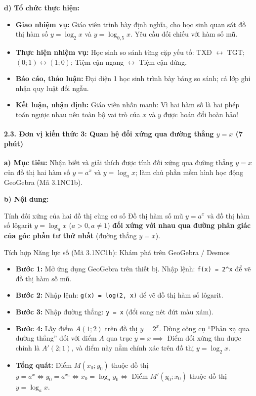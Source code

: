 \documentclass[12pt, a4paper]{article}
\begin{document}
\noindent \textbf{d) Tổ chức thực hiện:}
\begin{itemize}[leftmargin=0.6cm]
    \item \textbf{Giao nhiệm vụ:} Giáo viên trình bày định nghĩa, cho học sinh quan sát đồ thị hàm số $y = \log_2 x$ và $y = \log_{0{,}5} x$. Yêu cầu đối chiếu với hàm số mũ.
    \item \textbf{Thực hiện nhiệm vụ:} Học sinh so sánh từng cặp yếu tố: TXĐ $\leftrightarrow$ TGT; $(0; 1) \leftrightarrow (1; 0)$; Tiệm cận ngang $\leftrightarrow$ Tiệm cận đứng.
    \item \textbf{Báo cáo, thảo luận:} Đại diện 1 học sinh trình bày bảng so sánh; cả lớp ghi nhận quy luật đối ngẫu.
    \item \textbf{Kết luận, nhận định:} Giáo viên nhấn mạnh: Vì hai hàm số là hai phép toán ngược nhau nên toàn bộ vai trò của $x$ và $y$ được hoán đổi hoàn hảo!
\end{itemize}

\paragraph{2.3. Đơn vị kiến thức 3: Quan hệ đối xứng qua đường thẳng $y = x$ (7 phút)}

\noindent \textbf{a) Mục tiêu:}
Nhận biết và giải thích được tính đối xứng qua đường thẳng $y = x$ của đồ thị hai hàm số $y = a^x$ và $y = \log_a x$; làm chủ phần mềm hình học động GeoGebra (Mã 3.1NC1b).

\noindent \textbf{b) Nội dung:}
\begin{pedabox}{Tính đối xứng của hai đồ thị cùng cơ số}
Đồ thị hàm số mũ $y = a^x$ và đồ thị hàm số lôgarit $y = \log_a x$ ($a > 0, a \neq 1$) \textbf{đối xứng với nhau qua đường phân giác của góc phần tư thứ nhất} (đường thẳng $y = x$).
\end{pedabox}

\begin{aibox}{Tích hợp Năng lực số (Mã 3.1NC1b): Khám phá trên GeoGebra / Desmos}
\begin{itemize}[leftmargin=0.6cm]
    \item \textbf{Bước 1:} Mở ứng dụng GeoGebra trên thiết bị. Nhập lệnh: \texttt{f(x) = 2\textasciicircum x} để vẽ đồ thị hàm số mũ.
    \item \textbf{Bước 2:} Nhập lệnh: \texttt{g(x) = log(2, x)} để vẽ đồ thị hàm số lôgarit.
    \item \textbf{Bước 3:} Nhập đường thẳng: \texttt{y = x} (đổi sang nét đứt màu xám).
    \item \textbf{Bước 4:} Lấy điểm $A(1; 2)$ trên đồ thị $y = 2^x$. Dùng công cụ ``Phản xạ qua đường thẳng'' đối với điểm $A$ qua trục $y = x \implies$ Điểm đối xứng thu được chính là $A'(2; 1)$, và điểm này nằm chính xác trên đồ thị $y = \log_2 x$.
    \item \textbf{Tổng quát:} Điểm $M(x_0; y_0)$ thuộc đồ thị $y = a^x \iff y_0 = a^{x_0} \iff x_0 = \log_a y_0 \iff$ Điểm $M'(y_0; x_0)$ thuộc đồ thị $y = \log_a x$.
\end{itemize}
\end{aibox}
\end{document}
